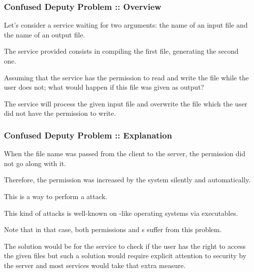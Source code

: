\begin{frame}
  \frametitle{Confused Deputy Problem :: Overview}

  Let's consider a service waiting for two arguments: the name of an input
  file and the name of an output file.

  \-

  The service provided consists in compiling the first file, generating the
  second one.

  \-

  Assuming that the service has the permission to read and write the
   file while the user does not; what would happen
  if this file was given as output?

  \-

  The service will process the given input file and overwrite the
   file which the user did not have the permission
  to write.
\end{frame}


\begin{frame}
  \frametitle{Confused Deputy Problem :: Explanation}

  When the file name was passed from the client to the server, the permission
  did not go along with it.

  \-

  Therefore, the permission was increased by the system silently and
  automatically.

  \-

  This is a way to perform a  attack.

  \-

  This kind of attacks is well-known on -like operating systems
  via  executables.

  \-

  Note that in that case, both  permissions and s
  suffer from this problem.

  \-

  The solution would be for the service to check if the user has the right to
  access the given files but such a solution would require explicit attention
  to security by the server and most services would take that extra measure.
\end{frame}


